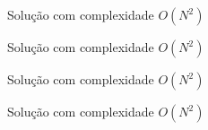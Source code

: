 \begin{frame}[fragile]{Solução com complexidade $O(N^2)$}
\end{frame}

\begin{frame}[fragile]{Solução com complexidade $O(N^2)$}
\end{frame}

\begin{frame}[fragile]{Solução com complexidade $O(N^2)$}
\end{frame}

\begin{frame}[fragile]{Solução com complexidade $O(N^2)$}
\end{frame}
